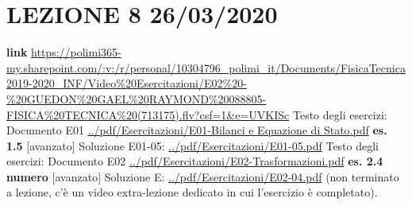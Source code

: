 \section*{LEZIONE 8 26/03/2020}
\textbf{link} \url{https://polimi365-my.sharepoint.com/:v:/r/personal/10304796_polimi_it/Documents/FisicaTecnica2019-2020_INF/Video%20Esercitazioni/E02%20-%20GUEDON%20GAEL%20RAYMOND%20088805-FISICA%20TECNICA%20(713175).flv?csf=1&e=UVKISc}\newline
\newline
Testo degli esercizi:\newline
Documento E01 \url{../pdf/Esercitazioni/E01-Bilanci e Equazione di Stato.pdf}\newline
\textbf{es. 1.5} [avanzato]\newline
Soluzione E01-05: \url{../pdf/Esercitazioni/E01-05.pdf}\newline
\newline
Testo degli esercizi:\newline
Documento E02 \url{../pdf/Esercitazioni/E02-Trasformazioni.pdf}\newline
\textbf{es. 2.4 numero} [avanzato]\newline
Soluzione E: \url{../pdf/Esercitazioni/E02-04.pdf} (non terminato a lezione, c'è un video extra-lezione dedicato in cui l'esercizio è completato).